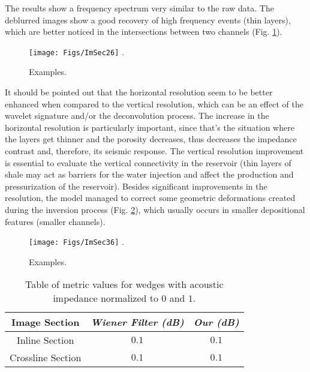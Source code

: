 \documentclass[journal]{IEEEtran}
\begin{document}
The results show a frequency spectrum very similar to the raw data.
The deblurred images show a good recovery of high frequency events
(thin layers), which are better noticed in the intersections between
two channels (Fig. \ref{ImSec26}).
\begin{figure}[!t]
\centering
\texttt{[image: Figs/ImSec26]}
\DeclareGraphicsExtensions.
\caption{Examples.}
\label{ImSec26}
\end{figure}
It should be pointed out that the horizontal resolution seem to be better enhanced when compared to the vertical resolution, which can be an effect of the wavelet signature and/or the deconvolution process. The increase in the horizontal resolution is particularly important, since that's the situation where the layers get thinner and the porosity decreases, thus decreases the impedance contrast and, therefore, its seismic response. The vertical resolution improvement is essential to evaluate the vertical connectivity in the reservoir (thin layers of shale may act as barriers for the water injection and affect the production and pressurization of the reservoir). Besides significant improvements in the resolution, the model managed to correct some geometric deformations created during the inversion process (Fig. \ref{ImSec36}), which usually occurs in smaller depositional features (smaller channels).
\begin{figure}[!t]
\centering
\texttt{[image: Figs/ImSec36]}
\DeclareGraphicsExtensions.
\caption{Examples.}
\label{ImSec36}
\end{figure}

\begin{table}[!t]
\renewcommand{\arraystretch}{1.3}
\caption{Table of metric values for wedges with acoustic impedance normalized to $0$ and $1$.}
\label{table_caso_1}
\centering
\begin{tabular}{|c||c||c|}
\hline
 \textbf{Image Section} & \textbf{\textit{Wiener Filter (dB)}} & \textbf{\textit{Our (dB)}}\\
\hline
Inline Section & $0.1$ & $0.1$ \\
\hline
Crossline Section & $0.1$ & $0.1$ \\
\hline
\end{tabular}
\end{table}
\end{document}
